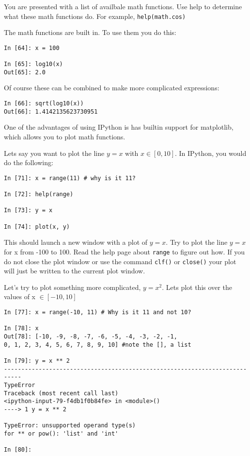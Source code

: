 \documentclass[12pt]{article}
\begin{document}
You are presented with a list of availbale math functions. Use help to determine what these math functions do. For example, \texttt{help(math.cos)}

The math functions are built in. To use them you do this:
\begin{lstlisting}[style=bash]
In [64]: x = 100

In [65]: log10(x) 
Out[65]: 2.0
\end{lstlisting}

Of course these can be combined to make more complicated expressions:

\begin{lstlisting}[style=bash]
In [66]: sqrt(log10(x))
Out[66]: 1.4142135623730951
\end{lstlisting}

One of the advantages of using IPython is has builtin support for matplotlib, which allows you to plot math functions.

Lets say you want to plot the line $y = x$ with $x \in [0, 10]$. In IPython, you would do the following:

\begin{lstlisting}[style=bash]
In [71]: x = range(11) # why is it 11?

In [72]: help(range)

In [73]: y = x

In [74]: plot(x, y)
\end{lstlisting}

This should launch a new window with a plot of $y = x$. Try to plot the line $y = x$ for x from -100 to 100. Read the help page about \texttt{range} to figure out how. If you do not close the plot window or use the command \texttt{clf()} or \texttt{close()} your plot will just be written to the current plot window.

Let's try to plot something more complicated, $y = x^2$. Lets plot this over the values of x $\in[-10, 10]$

\begin{lstlisting}[style=bash]
In [77]: x = range(-10, 11) # Why is it 11 and not 10?

In [78]: x
Out[78]: [-10, -9, -8, -7, -6, -5, -4, -3, -2, -1, 
0, 1, 2, 3, 4, 5, 6, 7, 8, 9, 10] #note the [], a list

In [79]: y = x ** 2
---------------------------------------------------------------------------
TypeError                                 
Traceback (most recent call last)
<ipython-input-79-f4db1f0b84fe> in <module>()
----> 1 y = x ** 2

TypeError: unsupported operand type(s) 
for ** or pow(): 'list' and 'int'

In [80]:
\end{lstlisting}
\end{document}
